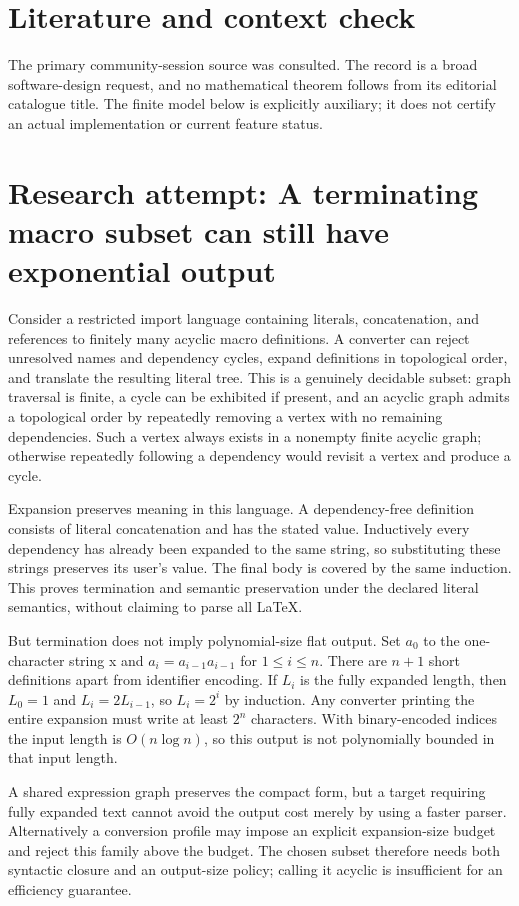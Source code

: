 \documentclass[11pt]{article}
\begin{document}
\section{Literature and context check}
The primary community-session source was consulted. The record is a broad software-design request, and no mathematical theorem follows from its editorial catalogue title. The finite model below is explicitly auxiliary; it does not certify an actual implementation or current feature status.
\section{Research attempt: A terminating macro subset can still have exponential output}
Consider a restricted import language containing literals, concatenation, and references to finitely many acyclic macro definitions. A converter can reject unresolved names and dependency cycles, expand definitions in topological order, and translate the resulting literal tree. This is a genuinely decidable subset: graph traversal is finite, a cycle can be exhibited if present, and an acyclic graph admits a topological order by repeatedly removing a vertex with no remaining dependencies. Such a vertex always exists in a nonempty finite acyclic graph; otherwise repeatedly following a dependency would revisit a vertex and produce a cycle.

Expansion preserves meaning in this language. A dependency-free definition consists of literal concatenation and has the stated value. Inductively every dependency has already been expanded to the same string, so substituting these strings preserves its user's value. The final body is covered by the same induction. This proves termination and semantic preservation under the declared literal semantics, without claiming to parse all LaTeX.

But termination does not imply polynomial-size flat output. Set $a_0$ to the one-character string x and $a_i=a_{i-1}a_{i-1}$ for $1\le i\le n$. There are $n+1$ short definitions apart from identifier encoding. If $L_i$ is the fully expanded length, then $L_0=1$ and $L_i=2L_{i-1}$, so $L_i=2^i$ by induction. Any converter printing the entire expansion must write at least $2^n$ characters. With binary-encoded indices the input length is $O(n\log n)$, so this output is not polynomially bounded in that input length.

A shared expression graph preserves the compact form, but a target requiring fully expanded text cannot avoid the output cost merely by using a faster parser. Alternatively a conversion profile may impose an explicit expansion-size budget and reject this family above the budget. The chosen subset therefore needs both syntactic closure and an output-size policy; calling it acyclic is insufficient for an efficiency guarantee.
\end{document}
